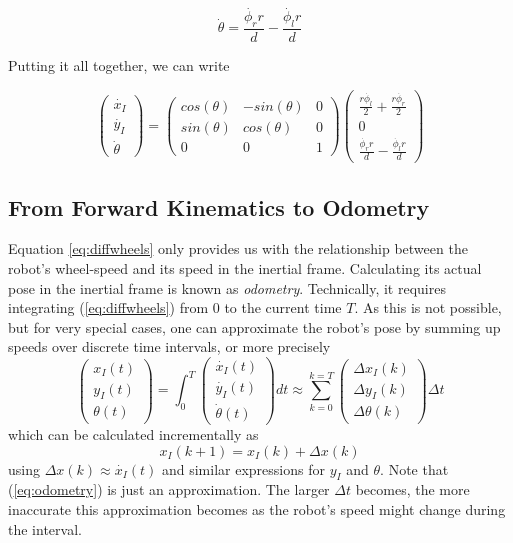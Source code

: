 \begin{equation}
\dot{\theta}=\frac{\dot{\phi_r} r}{d}-\frac{\dot{\phi_l} r}{d}
\end{equation}

Putting it all together, we can write

\begin{equation}\label{eq:diffwheels}
\left(\begin{array}{c} \dot{x_I}\\\dot{y_I}\\\dot{\theta}\end{array}\right)=\left(\begin{array}{ccc}
cos(\theta) & -sin(\theta) & 0 \\
sin(\theta) & cos(\theta) & 0 \\
0 & 0 & 1\end{array}\right)\left(\begin{array}{c}\frac{r\dot{\phi_l}}{2}+\frac{r\dot{\phi_r}}{2}\\0\\\frac{\dot{\phi_r} r}{d}-\frac{\dot{\phi_l} r}{d}\end{array}\right)
\end{equation}

\subsection{From Forward Kinematics to Odometry}
Equation \ref{eq:diffwheels} only provides us with the relationship between the robot's wheel-speed and its speed in the inertial frame. Calculating its actual pose in the inertial frame is known as \emph{odometry}. Technically, it requires integrating (\ref{eq:diffwheels}) from 0 to the current time $T$. As this is not possible, but for very special cases, one can approximate the robot's pose by summing up speeds over discrete time intervals, or more precisely
\begin{equation}
\left(\begin{array}{c} {x_I}(t)\\{y_I}(t)\\{\theta}(t)\end{array}\right)=
\int_0^T \left(\begin{array}{c} \dot{x_I}(t)\\\dot{y_I}(t)\\\dot{\theta}(t)\end{array}\right) dt \approx 
\sum_{k=0}^{k=T}\left(\begin{array}{c} \Delta{x_I}(k)\\\Delta{y_I}(k)\\\Delta{\theta}(k)\end{array}\right)\Delta t
\end{equation} which can be calculated incrementally as
\begin{equation}\label{eq:odometry}
x_I(k+1)=x_I(k)+\Delta x (k)
\end{equation}
using $\Delta x(k) \approx \dot{x_I}(t)$ and similar expressions for $y_I$ and $\theta$. Note that (\ref{eq:odometry}) is just an approximation. The larger $\Delta t$ becomes, the more inaccurate this approximation becomes as the robot's speed might change during the interval.   

